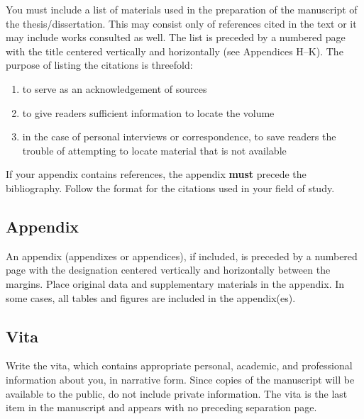 You must include a list of materials used in the preparation of the
manuscript of the thesis/dissertation. This may consist only of
references cited in the text or it may include works consulted as
well. The list is preceded by a numbered page with the title centered
vertically and horizontally (see Appendices H--K). The purpose of
listing the citations is threefold:
\begin{enumerate}
\item to serve as an acknowledgement of sources
\item to give readers sufficient information to locate the volume
\item in the case of personal interviews or correspondence, to save
  readers the trouble of attempting to locate material that is not
  available
\end{enumerate}

If your appendix contains references, the appendix \textbf{must}
precede the bibliography. Follow the format for the citations used in
your field of study.

\subsection{Appendix}
\label{sec:Appendix}

An appendix (appendixes or appendices), if included, is preceded by a
numbered page with the designation centered vertically and
horizontally between the margins. Place original data and
supplementary materials in the appendix. In some cases, all tables and
figures are included in the appendix(es).

\subsection{Vita}
\label{sec:Vita}

Write the vita, which contains appropriate personal, academic, and
professional information about you, in narrative form. Since copies of
the manuscript will be available to the public, do not include private
information. The vita is the last item in the manuscript and appears
with no preceding separation page.

